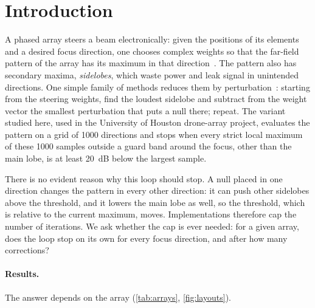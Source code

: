 \documentclass[11pt]{amsart}
\theoremstyle{plain}
\theoremstyle{definition}
\begin{document}
\maketitle

\section{Introduction}\label{sec:intro}

A phased array steers a beam electronically: given the positions of its elements and a desired
focus direction, one chooses complex weights so that the far-field pattern of the array has its
maximum in that direction~\cite{Balanis2016}.  The pattern also has secondary maxima,
\emph{sidelobes}, which waste power and leak signal in unintended directions.  One simple family
of methods reduces them by perturbation~\cite{Steyskal1982,Gong2024,MosierTODO}: starting from the
steering weights, find the loudest sidelobe and subtract from the weight vector the smallest
perturbation that puts a null there; repeat.  The variant studied here, used in the University of
Houston drone-array project, evaluates the pattern on a grid of 1000 directions and stops when
every strict local maximum of these 1000 samples outside a guard band around the focus, other than
the main lobe, is at least 20~dB below the largest sample.

There is no evident reason why this loop should stop.  A null placed in one direction changes
the pattern in every other direction: it can push other sidelobes above the threshold, and it
lowers the main lobe as well, so the threshold, which is relative to the current maximum, moves.
Implementations therefore cap the number of iterations.  We ask whether the cap is ever needed:
for a given array, does the loop stop on its own for every focus direction, and after how many
corrections?

\paragraph{Results.}  The answer depends on the array (\cref{tab:arrays}, \cref{fig:layouts}).
\end{document}
